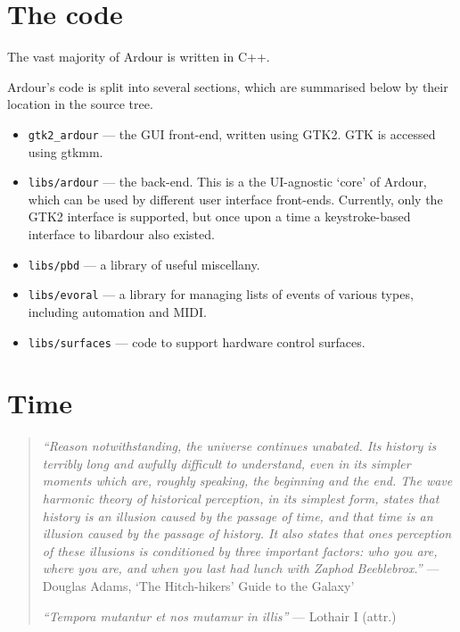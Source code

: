 \documentclass[10pt,a4paper]{book}
\newcommand{\code}[1]{\texttt{#1}}
\begin{document}
\section{The code}

The vast majority of Ardour is written in C++.  

Ardour's code is split into several sections, which are summarised
below by their location in the source tree.

\begin{itemize}
\item \code{gtk2\_ardour} --- the GUI front-end, written using GTK2.
  GTK is accessed using gtkmm.
\item \code{libs/ardour} --- the back-end.  This is a the UI-agnostic
  `core' of Ardour, which can be used by different user interface
  front-ends.  Currently, only the GTK2 interface is supported, but
  once upon a time a keystroke-based interface to libardour also
  existed.
\item \code{libs/pbd} --- a library of useful miscellany.
\item \code{libs/evoral} --- a library for managing lists of events of
  various types, including automation and MIDI\@.
\item \code{libs/surfaces} --- code to support hardware control
  surfaces.
\end{itemize}


\section{Time}

\begin{quote}
\emph{``Reason notwithstanding, the universe continues unabated.  Its
  history is terribly long and awfully difficult to understand, even
  in its simpler moments which are, roughly speaking, the beginning
  and the end.  The wave harmonic theory of historical perception, in
  its simplest form, states that history is an illusion caused by the
  passage of time, and that time is an illusion caused by the passage
  of history.  It also states that ones perception of these illusions
  is conditioned by three important factors: who you are, where you
  are, and when you last had lunch with Zaphod Beeblebrox.''} ---
Douglas Adams, `The Hitch-hikers' Guide to the Galaxy'

\medskip

\emph{``Tempora mutantur et nos mutamur in illis''} --- Lothair I (attr.)
\end{quote}
\end{document}
